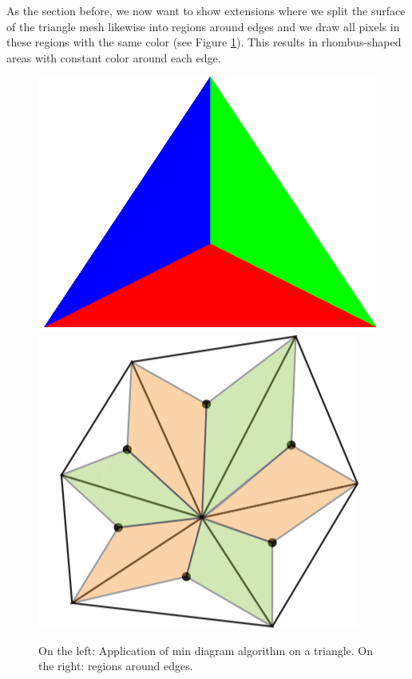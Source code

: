 \label{section:edge-area-chapter}
As the section before, we now want to show extensions where we split the surface of the triangle mesh likewise into regions around  edges and we draw all pixels in these regions with the same color (see Figure \ref{fig:min-area-edge}). This results in rhombus-shaped areas with constant color around each edge.

\begin{figure}[!h]
    \centering
    \centering
    \includegraphics[scale=0.15]{images/min.png}
    \endminipage\hfill
    \centering
    \includegraphics[scale=0.53]{images/edge-area.png}
    \endminipage
    \caption{On the left: Application of min diagram algorithm on a triangle. On the right: regions around edges.} \label{fig:min-area-edge}
\end{figure}

